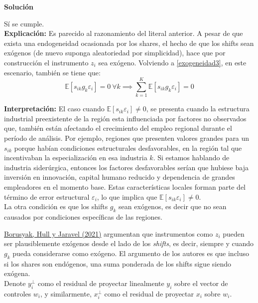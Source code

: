 \documentclass[a4paper, answers, addpoints, 11pt]{exam}
\newenvironment{solucion}{%
  \begin{mdframed}[
    backgroundcolor=blue!5,    %
    linecolor=blue!50,          %
    linewidth=2pt,              %
    leftmargin=10pt,            %
    rightmargin=8pt,           %
    topline=true,              %
    bottomline=true,            %
    roundcorner=10pt,           %
    innerleftmargin=10pt,       %
    innerrightmargin=10pt,      %
    innerbottommargin=10pt,     %
    innertopmargin=10pt         %
  ]%
  \begin{tcolorbox}[colframe=blue!50!black, colback=blue!50, coltitle=white, sharp corners=all, boxrule=1mm, width=\textwidth, halign=left, valign=center, top=0mm, bottom=0mm, left=0mm, right=0mm] \textbf{Solución} \end{tcolorbox} }{\end{mdframed}}
\begin{document}
\begin{enumerate}
\begin{itemize}
\begin{solucion}
        Sí se cumple.\\

        \textbf{Explicación:} Es parecido al razonamiento del literal anterior. A pesar de que exista una endogeneidad ocasionada por los shares, el hecho de que los shifts sean exógenos (de nuevo suponga aleatoriedad por simplicidad), hace que por construcción el instrumento $z_i$ sea exógeno. Volviendo a \ref{exogeneidad3}, en este escenario, también se tiene que:
 \[\mathbb{E}[s_{ik} g_k \varepsilon_i] =
 0 \: \forall k \implies   \sum_{k=1}^K \mathbb{E}[s_{ik} g_k \varepsilon_i]=0
\] 
        
\textbf{Interpretación:}  El caso cuando $\mathbb{E}[s_{ik}\varepsilon_i] \neq 0$, se presenta cuando la estructura industrial preexistente de la región esta influenciada por factores no observados que,  también están afectando el crecimiento del empleo regional durante el período de análisis.  Por ejemplo, regiones que presenten valores grandes para un \( s_{ik} \) porque habían condiciones estructurales desfavorables, en la región tal que incentivaban la especialización en esa industria $k$. Si estamos hablando de industria siderúrgica, entonces los factores desfavorables serían que hubiese baja inversión en innovación, capital humano reducido y dependencia de grandes empleadores en el momento base. Estas características locales forman parte del término de error estructural \( \varepsilon_i \), lo que implica que \( \mathbb{E}[s_{ik} \varepsilon_i] \ne 0 \). \\

La otra condición es que los shifts \( g_k \) sean exógenos, es decir que  no sean causados por condiciones específicas de las regiones.  \\
 
\end{solucion}

    \end{itemize}
\end{enumerate}

\href{https://academic.oup.com/restud/article-abstract/89/1/181/6294942?redirectedFrom=fulltext}{Borusyak, Hull y Jaravel (2021)} argumentan que instrumentos como $z_i$ pueden ser plausiblemente exógenos desde el lado de los \textit{shifts}, es decir, siempre y cuando $g_k$ pueda considerarse como exógeno. El argumento de los autores es que incluso si los shares son endógenos, una suma ponderada de los shifts sigue siendo exógena. \\

Denote $y^{\perp}_{i}$ como el residual de proyectar linealmente $y_i$ sobre el vector de controles $w_i$, y similarmente, $x^{\perp}_{i}$ como el residual de proyectar $x_i$ sobre $w_i$. 
\end{document}
